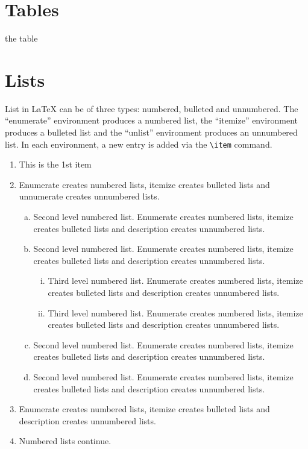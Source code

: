 \documentclass[unnumsec,webpdf,contemporary,large]{oup-authoring-template}%
\theoremstyle{thmstyleone}%
\theoremstyle{thmstyletwo}%
\theoremstyle{thmstylethree}%
\begin{document}
\section{Tables}\label{sec5}
the table


\section{Lists}\label{sec9}

List in \LaTeX{} can be of three types: numbered, bulleted and unnumbered. The ``enumerate'' environment produces a numbered list, the 
``itemize'' environment produces a bulleted list and the ``unlist''
environment produces an unnumbered list.
In each environment, a new entry is added via the \verb+\item+ command.
\begin{enumerate}[1.]
\item This is the 1st item

\item Enumerate creates numbered lists, itemize creates bulleted lists and
unnumerate creates unnumbered lists.
\begin{enumerate}[(a)]
\item Second level numbered list. Enumerate creates numbered lists, itemize creates bulleted lists and
description creates unnumbered lists.

\item Second level numbered list. Enumerate creates numbered lists, itemize creates bulleted lists and
description creates unnumbered lists.
\begin{enumerate}[(ii)]
\item Third level numbered list. Enumerate creates numbered lists, itemize creates bulleted lists and
description creates unnumbered lists.

\item Third level numbered list. Enumerate creates numbered lists, itemize creates bulleted lists and
description creates unnumbered lists.
\end{enumerate}

\item Second level numbered list. Enumerate creates numbered lists, itemize creates bulleted lists and
description creates unnumbered lists.

\item Second level numbered list. Enumerate creates numbered lists, itemize creates bulleted lists and
description creates unnumbered lists.
\end{enumerate}

\item Enumerate creates numbered lists, itemize creates bulleted lists and
description creates unnumbered lists.

\item Numbered lists continue.
\end{enumerate}
\end{document}
